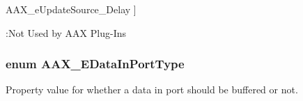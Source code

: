 \begin{Desc}
\begin{description}
{\hypertarget{a00206_a30be0398faf20c6b121239eb9399f3f7a221226f8de93849d1f5bbe773b230a3a}{}A\+A\+X\+\_\+e\+Update\+Source\+\_\+\+Delay\label{a00206_a30be0398faf20c6b121239eb9399f3f7a221226f8de93849d1f5bbe773b230a3a}
}]\begin{DoxyRefDesc}{\+:\+Not Used by A\+A\+X Plug-\/\+Ins}
\item[\hyperlink{a00378__not_used_by_aax_plugins000001}{\+:\+Not Used by A\+A\+X Plug-\/\+Ins}]\end{DoxyRefDesc}
\end{description}
\end{Desc}
\hypertarget{a00206_ab5677b173ad8647c24d34d28272d11fc}{}
\subsubsection[{A\+A\+X\+\_\+\+E\+Data\+In\+Port\+Type}]{\setlength{\rightskip}{0pt plus 5cm}enum {\bf A\+A\+X\+\_\+\+E\+Data\+In\+Port\+Type}}\label{a00206_ab5677b173ad8647c24d34d28272d11fc}


Property value for whether a data in port should be buffered or not. 


